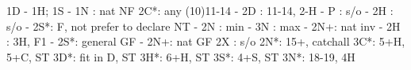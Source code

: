 1D - 1H; 1S -
1N : nat NF
2C*: any (10)11-14
   - 2D : 11-14, 2-H
        - P  : s/o
        - 2H : s/o
        - 2S*: F, not prefer to declare NT
             - 2N : min
             - 3N : max
        - 2N+: nat inv
   - 2H : 3H, F1
   - 2S*: general GF
   - 2N+: nat GF
2X : s/o
2N*: 15+, catchall
3C*: 5+H, 5+C, ST
3D*: fit in D, ST
3H*: 6+H, ST
3S*: 4+S, ST
3N*: 18-19, 4H

